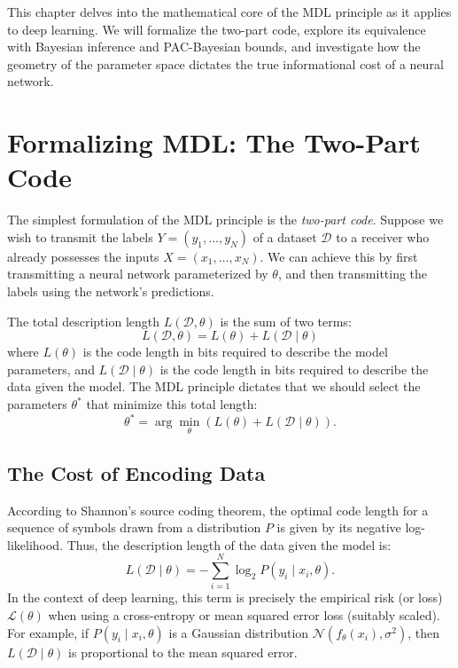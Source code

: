 This chapter delves into the mathematical core of the MDL principle as it applies to deep learning. We will formalize the two-part code, explore its equivalence with Bayesian inference and PAC-Bayesian bounds, and investigate how the geometry of the parameter space dictates the true informational cost of a neural network.

\section{Formalizing MDL: The Two-Part Code}

The simplest formulation of the MDL principle is the \textit{two-part code}. Suppose we wish to transmit the labels $Y = (y_1, \dots, y_N)$ of a dataset $\mathcal{D}$ to a receiver who already possesses the inputs $X = (x_1, \dots, x_N)$. We can achieve this by first transmitting a neural network parameterized by $\theta$, and then transmitting the labels using the network's predictions.

The total description length $L(\mathcal{D}, \theta)$ is the sum of two terms:
\begin{equation}
    L(\mathcal{D}, \theta) = L(\theta) + L(\mathcal{D} \mid \theta)
\end{equation}
where $L(\theta)$ is the code length in bits required to describe the model parameters, and $L(\mathcal{D} \mid \theta)$ is the code length in bits required to describe the data given the model. The MDL principle dictates that we should select the parameters $\theta^*$ that minimize this total length:
\begin{equation}
    \theta^* = \arg\min_\theta \left( L(\theta) + L(\mathcal{D} \mid \theta) \right).
\end{equation}

\subsection{The Cost of Encoding Data}

According to Shannon's source coding theorem, the optimal code length for a sequence of symbols drawn from a distribution $P$ is given by its negative log-likelihood. Thus, the description length of the data given the model is:
\begin{equation}
    L(\mathcal{D} \mid \theta) = -\sum_{i=1}^N \log_2 P(y_i \mid x_i, \theta).
\end{equation}
In the context of deep learning, this term is precisely the empirical risk (or loss) $\mathcal{L}(\theta)$ when using a cross-entropy or mean squared error loss (suitably scaled). For example, if $P(y_i \mid x_i, \theta)$ is a Gaussian distribution $\mathcal{N}(f_\theta(x_i), \sigma^2)$, then $L(\mathcal{D} \mid \theta)$ is proportional to the mean squared error.


